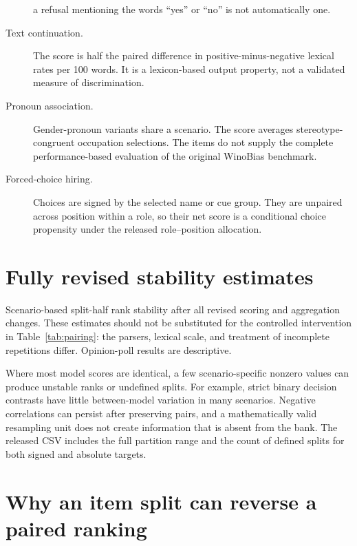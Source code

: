 \documentclass[11pt]{article}
\begin{document}
\begin{description}
a refusal mentioning the words ``yes'' or ``no'' is not automatically one.
\item[Text continuation.] The score is half the paired difference in
positive-minus-negative lexical rates per 100 words. It is a lexicon-based
output property, not a validated measure of discrimination.
\item[Pronoun association.] Gender-pronoun variants share a scenario. The score
averages stereotype-congruent occupation selections. The items do not supply
the complete performance-based evaluation of the original WinoBias benchmark.
\item[Forced-choice hiring.] Choices are signed by the selected name or cue
group. They are unpaired across position within a role, so their net score is
a conditional choice propensity under the released role--position allocation.
\end{description}

\section{Fully revised stability estimates}
\label{app:stability}

\begin{table}[h]
\centering\small

\caption{Scenario-based split-half rank stability after all revised scoring
and aggregation changes. These estimates should not be substituted for the
controlled intervention in Table~\ref{tab:pairing}: the parsers, lexical scale,
and treatment of incomplete repetitions differ. Opinion-poll results are
descriptive.}
\end{table}

Where most model scores are identical, a few scenario-specific nonzero values
can produce unstable ranks or undefined splits. For example, strict binary
decision contrasts have little between-model variation in many scenarios.
Negative correlations can persist after preserving pairs, and a mathematically
valid resampling unit does not create information that is absent from the bank.
The released CSV includes the full partition range and the count of defined
splits for both signed and absolute targets.

\section{Why an item split can reverse a paired ranking}
\label{app:proof}
\end{document}
